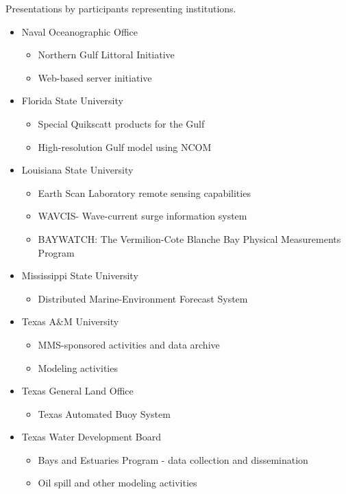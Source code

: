 Presentations by participants representing institutions.
\begin{itemize}
\item     Naval Oceanographic Office
  \begin{itemize}
  \item Northern Gulf Littoral Initiative
  \item Web-based server initiative
  \end{itemize}
\item     Florida State University
  \begin{itemize}
  \item Special Quikscatt products for the Gulf
  \item High-resolution Gulf model using NCOM
  \end{itemize}
\item     Louisiana State University
  \begin{itemize}
  \item Earth Scan Laboratory remote sensing capabilities
  \item WAVCIS- Wave-current surge information system
  \item BAYWATCH: The Vermilion-Cote Blanche Bay Physical Measurements Program
  \end{itemize}
\item     Mississippi State University
  \begin{itemize}
  \item Distributed Marine-Environment Forecast System
  \end{itemize}
\item     Texas A\&M University
  \begin{itemize}
  \item MMS-sponsored activities and data archive
  \item Modeling activities
  \end{itemize}
\item     Texas General Land Office
  \begin{itemize}
  \item Texas Automated Buoy System
  \end{itemize}
\item     Texas Water Development Board
  \begin{itemize}
  \item Bays and Estuaries Program - data collection and dissemination
  \item Oil spill and other modeling activities
  \end{itemize}

\end{itemize}
